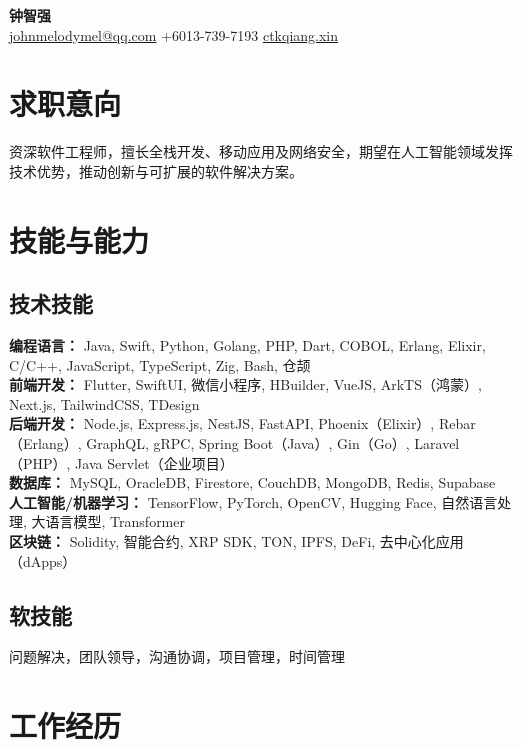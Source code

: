 \documentclass[11pt,a4paper]{article}
\begin{document}
\begin{center}
    {\LARGE\textbf{钟智强}} \\
    \href{mailto:johnmelodymel@qq.com}{johnmelodymel@qq.com} \textbar{} +6013-739-7193 \textbar{} \href{https://www.ctkqiang.xin}{ctkqiang.xin}
\end{center}

\section*{求职意向}
资深软件工程师，擅长全栈开发、移动应用及网络安全，期望在人工智能领域发挥技术优势，推动创新与可扩展的软件解决方案。

\section*{技能与能力}
\subsection*{技术技能}
\textbf{编程语言：} Java, Swift, Python, Golang, PHP, Dart, COBOL, Erlang, Elixir, C/C++, JavaScript, TypeScript, Zig, Bash, 仓颉 \\
\textbf{前端开发：} Flutter, SwiftUI, 微信小程序, HBuilder, VueJS, ArkTS（鸿蒙）, Next.js, TailwindCSS, TDesign \\
\textbf{后端开发：} Node.js, Express.js, NestJS, FastAPI, Phoenix（Elixir）, Rebar（Erlang）, GraphQL, gRPC, Spring Boot（Java）, Gin（Go）, Laravel（PHP）, Java Servlet（企业项目） \\
\textbf{数据库：} MySQL, OracleDB, Firestore, CouchDB, MongoDB, Redis, Supabase \\
\textbf{人工智能/机器学习：} TensorFlow, PyTorch, OpenCV, Hugging Face, 自然语言处理, 大语言模型, Transformer \\
\textbf{区块链：} Solidity, 智能合约, XRP SDK, TON, IPFS, DeFi, 去中心化应用（dApps）

\subsection*{软技能}
问题解决，团队领导，沟通协调，项目管理，时间管理

\section*{工作经历}
\end{document}
